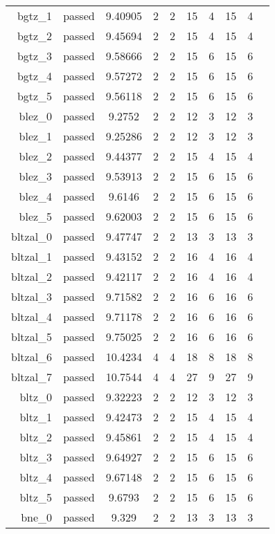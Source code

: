 \begin{longtable}{r|ccccccccc}
    bgtz\_1 & passed & 9.40905 & 2 & 2 & 15 & 4 & 15 & 4 \\
    bgtz\_2 & passed & 9.45694 & 2 & 2 & 15 & 4 & 15 & 4 \\
    bgtz\_3 & passed & 9.58666 & 2 & 2 & 15 & 6 & 15 & 6 \\
    bgtz\_4 & passed & 9.57272 & 2 & 2 & 15 & 6 & 15 & 6 \\
    bgtz\_5 & passed & 9.56118 & 2 & 2 & 15 & 6 & 15 & 6 \\
    blez\_0 & passed & 9.2752 & 2 & 2 & 12 & 3 & 12 & 3 \\
    blez\_1 & passed & 9.25286 & 2 & 2 & 12 & 3 & 12 & 3 \\
    blez\_2 & passed & 9.44377 & 2 & 2 & 15 & 4 & 15 & 4 \\
    blez\_3 & passed & 9.53913 & 2 & 2 & 15 & 6 & 15 & 6 \\
    blez\_4 & passed & 9.6146 & 2 & 2 & 15 & 6 & 15 & 6 \\
    blez\_5 & passed & 9.62003 & 2 & 2 & 15 & 6 & 15 & 6 \\
    bltzal\_0 & passed & 9.47747 & 2 & 2 & 13 & 3 & 13 & 3 \\
    bltzal\_1 & passed & 9.43152 & 2 & 2 & 16 & 4 & 16 & 4 \\
    bltzal\_2 & passed & 9.42117 & 2 & 2 & 16 & 4 & 16 & 4 \\
    bltzal\_3 & passed & 9.71582 & 2 & 2 & 16 & 6 & 16 & 6 \\
    bltzal\_4 & passed & 9.71178 & 2 & 2 & 16 & 6 & 16 & 6 \\
    bltzal\_5 & passed & 9.75025 & 2 & 2 & 16 & 6 & 16 & 6 \\
    bltzal\_6 & passed & 10.4234 & 4 & 4 & 18 & 8 & 18 & 8 \\
    bltzal\_7 & passed & 10.7544 & 4 & 4 & 27 & 9 & 27 & 9 \\
    bltz\_0 & passed & 9.32223 & 2 & 2 & 12 & 3 & 12 & 3 \\
    bltz\_1 & passed & 9.42473 & 2 & 2 & 15 & 4 & 15 & 4 \\
    bltz\_2 & passed & 9.45861 & 2 & 2 & 15 & 4 & 15 & 4 \\
    bltz\_3 & passed & 9.64927 & 2 & 2 & 15 & 6 & 15 & 6 \\
    bltz\_4 & passed & 9.67148 & 2 & 2 & 15 & 6 & 15 & 6 \\
    bltz\_5 & passed & 9.6793 & 2 & 2 & 15 & 6 & 15 & 6 \\
    bne\_0 & passed & 9.329 & 2 & 2 & 13 & 3 & 13 & 3 \\

\end{longtable}
